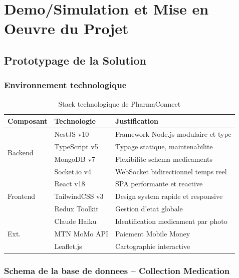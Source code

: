 \documentclass[12pt,a4paper]{report}
\begin{document}
\chapter{Demo/Simulation et Mise en Oeuvre du Projet}

\section{Prototypage de la Solution}

\subsection{Environnement technologique}

\begin{table}[ht]
\centering
\caption{Stack technologique de PharmaConnect}
\renewcommand{\arraystretch}{1.4}
\begin{tabularx}{\textwidth}{|l|l|X|}
\hline
\rowcolor{vertpharma!20}
\textbf{Composant} & \textbf{Technologie} & \textbf{Justification} \\ \hline
\multirow{4}{*}{Backend} & NestJS v10 & Framework Node.js modulaire et type \\ \cline{2-3}
 & TypeScript v5 & Typage statique, maintenabilite \\ \cline{2-3}
 & MongoDB v7 & Flexibilite schema medicaments \\ \cline{2-3}
 & Socket.io v4 & WebSocket bidirectionnel temps reel \\ \hline
\multirow{3}{*}{Frontend} & React v18 & SPA performante et reactive \\ \cline{2-3}
 & TailwindCSS v3 & Design system rapide et responsive \\ \cline{2-3}
 & Redux Toolkit & Gestion d'etat globale \\ \hline
\multirow{3}{*}{Ext.} & Claude Haiku & Identification medicament par photo \\ \cline{2-3}
 & MTN MoMo API & Paiement Mobile Money \\ \cline{2-3}
 & Leaflet.js & Cartographie interactive \\ \hline
\end{tabularx}
\end{table}

\subsection{Schema de la base de donnees -- Collection Medication}
\end{document}
